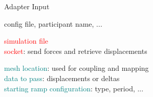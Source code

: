 \documentclass[10pt,t]{beamer}
\begin{document}
\begin{frame}{Adapter Input}
  \vspace{1.0cm}
  \begin{description}[Simulation]
  \itemsep 10pt
  \item[preCICE] \textcolor{dorange}{config file, participant name, ...}
  \item[MBDyn]      \textcolor{red}{simulation file} \\
                    \textcolor{red}{socket}: send forces and retrieve displacements \\
  \item[Simulation] \textcolor{teal}{mesh location}: used for coupling and mapping\\
                    \textcolor{teal}{data to pass}: displacements or deltas\\
                    \textcolor{teal}{starting ramp configuration}: type, period, ...
  \end{description}


\end{frame}
\end{document}
